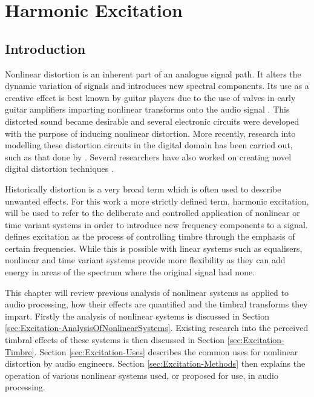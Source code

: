 \chapter{Harmonic Excitation}
\label{chap:Excitation}

\section{Introduction}
\label{sec:Excitation-Introduction}
	Nonlinear distortion is an inherent part of an analogue signal path. It alters the dynamic variation of signals and
	introduces new spectral components. Its use as a creative effect is best known by guitar players due to the use of
	valves in early guitar amplifiers imparting nonlinear transforms onto the audio signal
	\citep{dutilleux2011nonlinear}. This distorted sound became desirable and several electronic circuits were developed
	with the purpose of inducing nonlinear distortion. More recently, research into modelling these distortion circuits
	in the digital domain has been carried out, such as that done by \citet{pakarinen2009a}. Several researchers have
	also worked on creating novel digital distortion techniques \citep{fernandez-cid2001distortion, puckette2007patch,
	pekonen2008coefficient}.

	Historically distortion is a very broad term which is often used to describe unwanted effects. For this work a more
	strictly defined term, harmonic excitation, will be used to refer to the deliberate and controlled application of
	nonlinear or time variant systems in order to introduce new frequency components to a signal.
	\citet{dutilleux2011nonlinear} defines excitation as the process of controlling timbre through the emphasis of
	certain frequencies. While this is possible with linear systems such as equalisers, nonlinear and time variant
	systems provide more flexibility as they can add energy in areas of the spectrum where the original signal had none.

	This chapter will review previous analysis of nonlinear systems as applied to audio processing, how their effects
	are quantified and the timbral transforms they impart. Firstly the analysis of nonlinear systems is discussed in
	Section \ref{sec:Excitation-AnalysisOfNonlinearSystems}. Existing research into the perceived timbral effects of
	these systems is then discussed in Section \ref{sec:Excitation-Timbre}. Section \ref{sec:Excitation-Uses} describes
	the common uses for nonlinear distortion by audio engineers. Section \ref{sec:Excitation-Methods} then explains the
	operation of various nonlinear systems used, or proposed for use, in audio processing.

